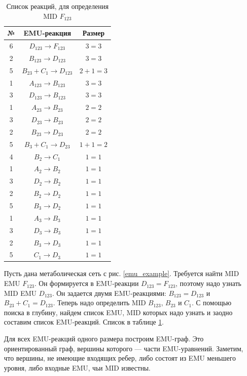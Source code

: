 \documentclass[14pt, a4paper]{extreport}
\begin{document}
\clearpage
\begin{table}
	\begin{tabular}{c c c}
		\hline
		№ & EMU-реакция & Размер\\
		\hline
		6 & $D_{123} \to F_{123}$ & $3 = 3$\\
		2 & $B_{123} \to D_{123}$ & $3 = 3$\\
		5 & $B_{23} + C_1 \to D_{123}$ & $2 + 1 = 3$\\
		1 & $A_{123} \to B_{123}$ & $3 = 3$\\
		3 & $D_{123} \to B_{123}$ & $3 = 3$\\
		1 & $A_{23} \to B_{23}$ & $2 = 2$\\
		3 & $D_{23} \to B_{23}$ & $2 = 2$\\
		2 & $B_{23} \to D_{23}$ & $2 = 2$\\
		5 & $B_3 + C_1 \to D_{23}$ & $1 + 1 = 2$\\
		4 & $B_2 \to C_1$ & $1 = 1$\\
		1 & $A_2 \to B_2$ & $1 = 1$\\
		3 & $D_2 \to B_2$ & $1 = 1$\\
		2 & $B_2 \to D_2$ & $1 = 1$\\
		5 & $B_3 \to D_2$ & $1 = 1$\\
		1 & $A_3 \to B_3$ & $1 = 1$\\
		3 & $D_3 \to B_3$ & $1 = 1$\\
		2 & $B_3 \to D_3$ & $1 = 1$\\
		5 & $C_1 \to D_3$ & $1 = 1$\\
	\end{tabular}
	\caption{Список реакций, для определения MID $F_{123}$}
	\label{all_emu_reactions}
\end{table}

Пусть дана метаболическая сеть с рис. \ref{emu_example}. Требуется найти MID EMU $F_{123}$. Он формируется в EMU-реакции $D_{123} = F_{123}$, поэтому надо узнать MID EMU $D_{123}$. Он задается двумя EMU-реакциями: $B_{123} = D_{123}$ и $B_{23} + C_1 = D_{123}$. Теперь надо определить MID $B_{123}$, $B_{23}$ и $C_1$. С помощью поиска в глубину, найдем список EMU, MID которых надо узнать и заодно составим список EMU-реакций. Список в таблице \ref{all_emu_reactions}.

Для всех EMU-реакций одного размера построим EMU-граф. Это ориентированный граф, вершины которого --- части EMU-уравнений. Заметим, что вершины, не имеющие входящих ребер, либо состоят из EMU меньшего уровня, либо входные EMU, чьи MID известны. 
\end{document}
